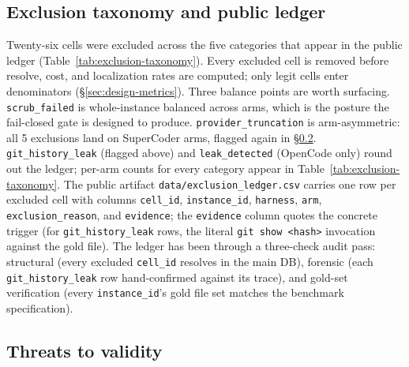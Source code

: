 \subsection{Exclusion taxonomy and public ledger}
\label{sec:integrity-ledger}

Twenty-six cells were excluded across the five categories that appear in the public
ledger (Table~\ref{tab:exclusion-taxonomy}). Every excluded cell is removed before
resolve, cost, and localization rates are computed; only legit cells enter denominators
(\S\ref{sec:design-metrics}). Three balance points are worth surfacing.
\texttt{scrub\_failed} is whole-instance balanced across arms, which is the posture the
fail-closed gate is designed to produce. \texttt{provider\_truncation} is arm-asymmetric:
all 5 exclusions land on SuperCoder arms, flagged again in \S\ref{sec:integrity-threats}.
\texttt{git\_history\_leak} (flagged above) and \texttt{leak\_detected} (OpenCode only)
round out the ledger; per-arm counts for every category appear in
Table~\ref{tab:exclusion-taxonomy}. The public artifact
\texttt{data/exclusion\_ledger.csv} carries one row per excluded cell with columns
\texttt{cell\_id}, \texttt{instance\_id}, \texttt{harness}, \texttt{arm},
\texttt{exclusion\_reason}, and \texttt{evidence}; the \texttt{evidence} column quotes
the concrete trigger (for \texttt{git\_history\_leak} rows, the literal
\texttt{git show <hash>} invocation against the gold file). The ledger has been through a
three-check audit pass: structural (every excluded \texttt{cell\_id} resolves in the main
DB), forensic (each \texttt{git\_history\_leak} row hand-confirmed against its trace),
and gold-set verification (every \texttt{instance\_id}'s gold file set matches the
benchmark specification).

\begin{table}[!tbp]
  \centering
  \caption{Exclusion taxonomy. Counts recomputed from
    \texttt{data/exclusion\_ledger.csv}; row totals sum to 26 across 5 categories. All
    excluded cells are removed from rate denominators.}
  \label{tab:exclusion-taxonomy}
  
\end{table}

\FloatBarrier
\subsection{Threats to validity}
\label{sec:integrity-threats}

